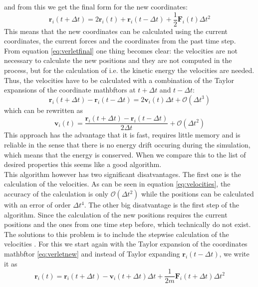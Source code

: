 \documentclass[12pt]{article}
\begin{document}
and from this we get the final form for the new coordinates:
\begin{equation}
    \label{eq:verletfinal}
    \mathbf{r}_i(t+\Delta t) = 2\mathbf{r}_i(t)+ \mathbf{r}_i(t-\Delta t)+ \frac1{2} {\mathbf{F}}_i(t) \Delta t^2
\end{equation}
This means that the new coordinates can be calculated using the current coordinates, the current forces and the coordinates from the past time step.\\
From equation \eqref{eq:verletfinal} one thing becomes clear: the velocities are not necessary to calculate the new positions and they are not
computed in the process, but for the calculation of i.e. the kinetic energy the velocities are needed. Thus, the velocities have to be calculated with
a combination of the Taylor expansions of the coordinate mathbftors at $t+\Delta t$ and $t-\Delta t$:
\begin{equation}
    \mathbf{r}_i(t+\Delta t) - \mathbf{r}_i(t-\Delta t) = 2\mathbf{v}_i(t)\Delta t + \mathcal{O}(\Delta t^3)
\end{equation}
which can be rewritten as
\begin{equation}
    \label{eq:velocities}
    \mathbf{v}_i(t) = \frac{\mathbf{r}_i(t+\Delta t) - \mathbf{r}_i(t-\Delta t)}{2\Delta t} + \mathcal{O}(\Delta t^2)
\end{equation}
This approach has the advantage that it is fast, requires little memory and is reliable in the sense that there is no energy drift occuring during the
simulation, which means that the energy is conserved. When we compare this to the list of desired properties this seems like a good algorithm.\\
This algorithm however has two significant disatvantages. The first one is the calculation of the velocities. As can be seen in equation
\eqref{eq:velocities}, the accuracy of the calculation is only $\mathcal{O}(\Delta t^2)$ while the positions can be calculated with an error of order
$\Delta t^4$. The other big disatvantage is the first step of the algorithm. Since the calculation of the new positions requires the current positions
and the ones from one time step before, which technically do not exist.\\
The solutions to this problem is to include the stepwise calculation of the velocities \cite{swope1982}. For this we start again with the Taylor
expansion of the coordinates mathbftor \eqref{eq:verletnew} and instead of Taylor expanding $\mathbf{r}_i(t-\Delta t)$, we write it as 
\begin{equation}
    \mathbf{r}_i(t) = \mathbf{r}_i(t+\Delta t) - \mathbf{v}_i(t+\Delta t) \Delta t + \frac1{2m} \mathbf{F}_i(t+\Delta t) \Delta t^2
\end{equation}
\end{document}
